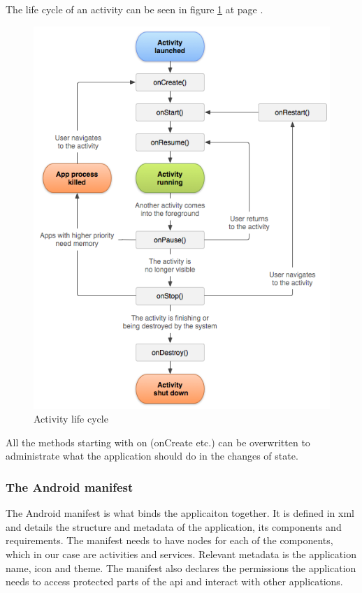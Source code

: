 The life cycle of an activity can be seen in figure \ref{fig:lifecycle} at page \pageref{fig:lifecycle}.
\begin{figure}
	\includegraphics[width=\textwidth]{activity_lifecycle}
	\caption{Activity life cycle \cite{bib:alc}}
	\label{fig:lifecycle}
\end{figure}

All the methods starting with on (onCreate etc.) can be overwritten to administrate what the application should do in the changes of state.

\subsubsection{The Android manifest}
The Android manifest \cite{bib:aman} is what binds the applicaiton together. It is defined in \gls{xml} and details the structure and metadata of the application, its components and requirements. The manifest needs to have nodes for each of the components, which in our case are activities and services. Relevant metadata is the application name, icon and theme. The manifest also declares the permissions the application needs to access protected parts of the \gls{api} and interact with other applications.

